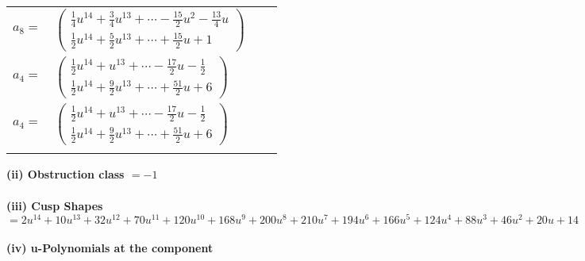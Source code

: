 \documentclass[1p]{elsarticle_modified}
\theoremstyle{definition}
\begin{document}
\begin{tabular}{m{7pt} m{180pt} m{7pt} m{180pt} }
\flushright $a_{8}=$&$\begin{pmatrix}\frac{1}{4} u^{14}+\frac{3}{4} u^{13}+\cdots-\frac{15}{2} u^2-\frac{13}{4} u\\\frac{1}{2} u^{14}+\frac{5}{2} u^{13}+\cdots+\frac{15}{2} u+1\end{pmatrix}$ \\
\flushright $a_{4}=$&$\begin{pmatrix}\frac{1}{2} u^{14}+u^{13}+\cdots-\frac{17}{2} u-\frac{1}{2}\\\frac{1}{2} u^{14}+\frac{9}{2} u^{13}+\cdots+\frac{51}{2} u+6\end{pmatrix}$\\ \flushright $a_{4}=$&$\begin{pmatrix}\frac{1}{2} u^{14}+u^{13}+\cdots-\frac{17}{2} u-\frac{1}{2}\\\frac{1}{2} u^{14}+\frac{9}{2} u^{13}+\cdots+\frac{51}{2} u+6\end{pmatrix}$\\&\end{tabular}
\flushleft \textbf{(ii) Obstruction class $= -1$}\\~\\
\flushleft \textbf{(iii) Cusp Shapes $= 2 u^{14}+10 u^{13}+32 u^{12}+70 u^{11}+120 u^{10}+168 u^9+200 u^8+210 u^7+194 u^6+166 u^5+124 u^4+88 u^3+46 u^2+20 u+14$}\\~\\
\newpage\renewcommand{\arraystretch}{1}
\flushleft \textbf{(iv) u-Polynomials at the component}\newline \\
\end{document}
